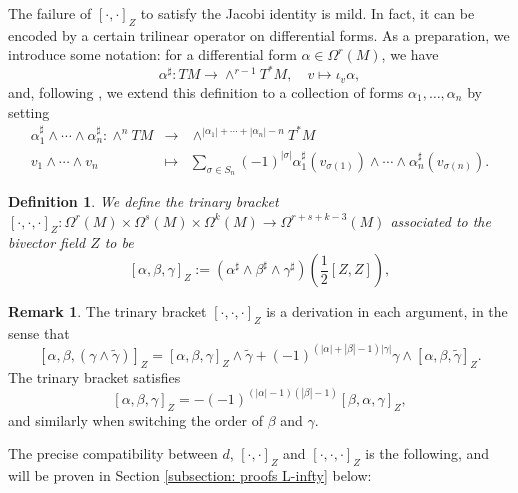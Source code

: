 \documentclass[11pt,thmsa]{amsart}
\newtheorem{definition}[theorem]{Definition}
\theoremstyle{definition}
\newtheorem{remark}[theorem]{Remark}
\begin{document}
{The failure of $[\cdot,\cdot]_Z$ to satisfy the Jacobi identity is mild. In fact, it can be encoded by a certain trilinear operator on differential forms. As a preparation, we introduce some notation: for a differential form $\alpha \in \Omega^r(M)$, we have 
$$\alpha^\sharp: TM \to \wedge^{r-1}T^*M, \quad v \mapsto \iota_v\alpha,$$
and, following \cite[\S 2.3]{FZgeo}, we extend this definition to a collection of forms $\alpha_1,\dots,\alpha_n$ by setting
\begin{eqnarray*}
 \alpha_1^\sharp \wedge \cdots \wedge \alpha_n^\sharp: \wedge^n TM &\to& \wedge^{|\alpha_1|+\cdots +|\alpha_n|-n}T^*M \\
 v_1\wedge \cdots \wedge v_n & \mapsto & \sum_{\sigma \in S_n}(-1)^{|\sigma|}\alpha_1^\sharp(v_{\sigma(1)})\wedge \cdots \wedge \alpha_n^\sharp(v_{\sigma(n)}).
\end{eqnarray*}

\begin{definition}\label{definition: trinary bracket}
We define the trinary bracket $[\cdot,\cdot,\cdot]_Z: \Omega^r(M)\times \Omega^s(M)\times \Omega^k(M)\to \Omega^{r+s+k-3}(M)$ associated to the bivector field $Z$
to be
$$[\alpha,\beta,\gamma]_Z:= (\alpha^\sharp \wedge \beta^\sharp \wedge \gamma^\sharp)(\frac{1}{2}[Z,Z]),$$
\end{definition}

\begin{remark}\label{rem:Kos3der}
The trinary bracket $[\cdot,\cdot,\cdot]_Z$ is a derivation in each argument, in the sense that
$$[\alpha, \beta, (\gamma\wedge \tilde{\gamma})]_Z=
[\alpha, \beta, \gamma]_Z\wedge \tilde{\gamma}+(-1)^{(|\alpha|+|\beta|-1)|\gamma|}\gamma\wedge [\alpha,\beta, \tilde{\gamma}]_Z.$$
{The trinary bracket satisfies $$[\alpha, \beta, \gamma]_Z=
-(-1)^{(|\alpha|-1)(|\beta|-1)}
[\beta, \alpha,\gamma]_Z,$$
and similarly when switching the order of $\beta$ and $\gamma$.}



The precise compatibility between $d$, $[\cdot,\cdot]_Z$ and $[\cdot,\cdot,\cdot]_Z$ is the following, and will be proven in Section \ref{subsection: proofs L-infty} below:
\end{remark}

}
\end{document}
